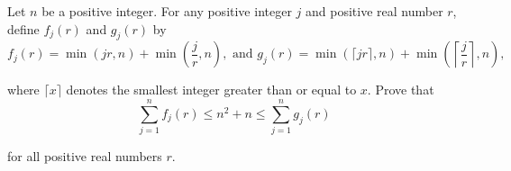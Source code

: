 Let $n$ be a positive integer. For any positive integer $j$ and positive real number $r$,  define $f_j(r)$ and $g_j(r)$ by\[f_j(r) = \min (jr, n) + \min\left(\frac{j}{r}, n\right), \text{ and } g_j(r) = \min (\lceil jr\rceil, n) + \min \left(\left\lceil\frac{j}{r}\right\rceil, n\right),\]

where $\lceil x\rceil$ denotes the smallest integer greater than or equal to $x$. Prove that\[\sum_{j=1}^n f_j(r)\leq n^2+n\leq \sum_{j=1}^n g_j(r)\]

for all positive real numbers $r$.